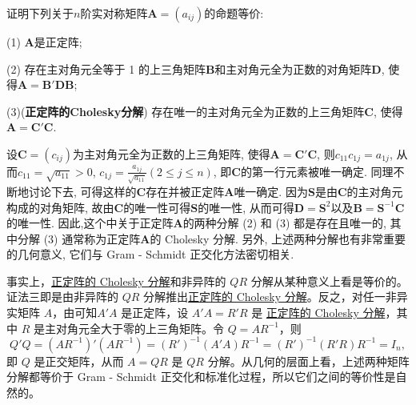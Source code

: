 \documentclass[../../main.tex]{subfiles}%
\begin{document}
\begin{proposition}\label{proposition:正定阵的3个充要条件}
证明下列关于$n$阶实对称矩阵$\boldsymbol{A}=(a_{ij})$的命题等价:

(1) $\boldsymbol{A}$是正定阵;

(2) 存在主对角元全等于 1 的上三角矩阵$\boldsymbol{B}$和主对角元全为正数的对角矩阵$\boldsymbol{D}$, 使得$\boldsymbol{A}=\boldsymbol{B}'\boldsymbol{D}\boldsymbol{B}$;

(3)(\textbf{正定阵的Cholesky分解}) 存在唯一的主对角元全为正数的上三角矩阵$\boldsymbol{C}$, 使得$\boldsymbol{A}=\boldsymbol{C}'\boldsymbol{C}$.
\end{proposition}
\begin{remark}
设$\boldsymbol{C}=(c_{ij})$为主对角元全为正数的上三角矩阵, 使得$\boldsymbol{A}=\boldsymbol{C}'\boldsymbol{C}$, 则$c_{11}c_{1j}=a_{1j}$, 从而$c_{11}=\sqrt{a_{11}}>0$, $c_{1j}=\frac{a_{1j}}{\sqrt{a_{11}}}(2\leqslant  j\leqslant  n)$, 即$\boldsymbol{C}$的第一行元素被唯一确定. 同理不断地讨论下去, 可得这样的$\boldsymbol{C}$存在并被正定阵$\boldsymbol{A}$唯一确定. 因为$\boldsymbol{S}$是由$\boldsymbol{C}$的主对角元构成的对角矩阵, 故由$\boldsymbol{C}$的唯一性可得$\boldsymbol{S}$的唯一性, 从而可得$\boldsymbol{D}=\boldsymbol{S}^2$以及$\boldsymbol{B}=\boldsymbol{S}^{-1}\boldsymbol{C}$的唯一性. 因此,这个中关于正定阵$\boldsymbol{A}$的两种分解 (2) 和 (3) 都是存在且唯一的, 其中分解 (3) 通常称为正定阵$\boldsymbol{A}$的 Cholesky 分解. 另外, 上述两种分解也有非常重要的几何意义, 它们与 Gram - Schmidt 正交化方法密切相关. 
\end{remark}
\begin{remark}
事实上，\hyperref[proposition:正定阵的3个充要条件]{正定阵的 Cholesky 分解}和非异阵的 $QR$ 分解从某种意义上看是等价的。{\color{blue}证法三}即是由非异阵的 $QR$ 分解推出\hyperref[proposition:正定阵的3个充要条件]{正定阵的 Cholesky 分解}。反之，对任一非异实矩阵 $A$，由可知$A'A$ 是正定阵，设 $A'A = R'R$ 是 \hyperref[proposition:正定阵的3个充要条件]{正定阵的 Cholesky 分解}，其中 $R$ 是主对角元全大于零的上三角矩阵。令 $Q = AR^{-1}$，则
\[
Q'Q=(AR^{-1})'(AR^{-1})=(R')^{-1}(A'A)R^{-1}=(R')^{-1}(R'R)R^{-1}=I_n,
\]
即 $Q$ 是正交矩阵，从而 $A = QR$ 是 $QR$ 分解。从几何的层面上看，上述两种矩阵分解都等价于 Gram - Schmidt 正交化和标准化过程，所以它们之间的等价性是自然的。
\end{remark}
\end{document}
